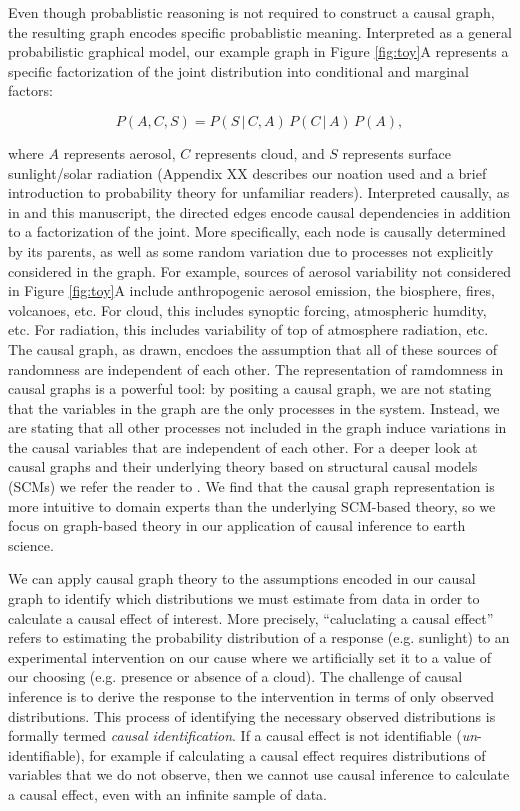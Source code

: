 \documentclass[12pt]{article}
\begin{document}
Even though probablistic reasoning is not required to construct a
causal graph, the resulting graph encodes specific probablistic
meaning. Interpreted as a general probabilistic graphical model, our
example graph in Figure \ref{fig:toy}A represents a specific
factorization of the joint distribution into conditional and marginal
factors:

\begin{equation}
  P(A, C, S) = P(S \, | \,C, A) \, P(C \, | \, A) \, P(A),
\end{equation}

where $A$ represents aerosol, $C$ represents cloud, and $S$ represents
surface sunlight/solar radiation (Appendix
XX describes our noation used and a brief introduction to probability
theory for unfamiliar readers). Interpreted causally, as in \citet{pearl1995causal} and this
manuscript, the directed edges encode causal dependencies in addition
to a factorization of the joint. More specifically, each node is
causally determined by its parents, as well as some random variation
due to processes not explicitly considered in the graph. For example,
sources of aerosol variability not considered in Figure \ref{fig:toy}A
include anthropogenic aerosol emission, the biosphere, fires,
volcanoes, etc. For cloud, this includes synoptic forcing, atmospheric
humdity, etc. For radiation, this includes variability of top of
atmosphere radiation, etc. The causal graph, as drawn, encdoes the
assumption that all of these sources of randomness are independent of
each other. The representation of ramdomness in causal graphs is a
powerful tool: by positing a causal graph, we are not stating that the
variables in the graph are the only processes in the system. Instead,
we are stating that all other processes not included in the graph
induce variations in the causal variables that are independent of each
other. For a deeper look at causal graphs and their underlying theory
based on structural causal models (SCMs) we refer the reader to
\citet{pearl2009}. We find that the causal graph representation is
more intuitive to domain experts than the underlying SCM-based theory,
so we focus on graph-based theory in our application of causal
inference to earth science.

We can apply causal graph theory
\citep[e.g.,][]{pearl1995causal,shpitser2006} to the assumptions
encoded in our causal graph to identify which distributions we must
estimate from data in order to calculate a causal effect of
interest. More precisely, ``caluclating a causal effect'' refers to
estimating the probability distribution of a response (e.g. sunlight)
to an experimental intervention on our cause where we artificially set
it to a value of our choosing (e.g. presence or absence of a
cloud). The challenge of causal inference is to derive the response to
the intervention in terms of only observed distributions. This process
of identifying the necessary observed distributions is formally termed
\emph{causal identification}. If a causal effect is not identifiable
(\emph{un}-identifiable), for example if calculating a causal effect
requires distributions of variables that we do not observe, then we
cannot use causal inference to calculate a causal effect, even with an
infinite sample of data.
\end{document}

